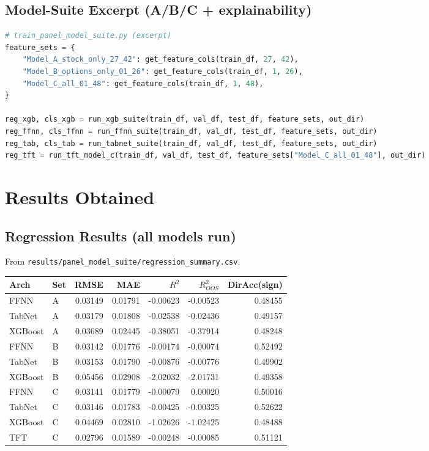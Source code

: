 \documentclass[11pt]{article}
\begin{document}
\subsection{Model-Suite Excerpt (A/B/C + explainability)}
\begin{lstlisting}[language=Python]
# train_panel_model_suite.py (excerpt)
feature_sets = {
    "Model_A_stock_only_27_42": get_feature_cols(train_df, 27, 42),
    "Model_B_options_only_01_26": get_feature_cols(train_df, 1, 26),
    "Model_C_all_01_48": get_feature_cols(train_df, 1, 48),
}

reg_xgb, cls_xgb = run_xgb_suite(train_df, val_df, test_df, feature_sets, out_dir)
reg_ffnn, cls_ffnn = run_ffnn_suite(train_df, val_df, test_df, feature_sets, out_dir)
reg_tab, cls_tab = run_tabnet_suite(train_df, val_df, test_df, feature_sets, out_dir)
reg_tft = run_tft_model_c(train_df, val_df, test_df, feature_sets["Model_C_all_01_48"], out_dir)
\end{lstlisting}

\section{Results Obtained}

\subsection{Regression Results (all models run)}
From \texttt{results/panel\_model\_suite/regression\_summary.csv}.

\begin{footnotesize}
\begin{longtable}{l l r r r r r}
\toprule
Arch & Set & RMSE & MAE & $R^2$ & $R^2_{OOS}$ & DirAcc(sign) \\
\midrule
\endhead
FFNN & A & 0.03149 & 0.01791 & -0.00623 & -0.00523 & 0.48455 \\
TabNet & A & 0.03179 & 0.01808 & -0.02538 & -0.02436 & 0.49157 \\
XGBoost & A & 0.03689 & 0.02445 & -0.38051 & -0.37914 & 0.48248 \\
FFNN & B & 0.03142 & 0.01776 & -0.00174 & -0.00074 & 0.52492 \\
TabNet & B & 0.03153 & 0.01790 & -0.00876 & -0.00776 & 0.49902 \\
XGBoost & B & 0.05456 & 0.02908 & -2.02032 & -2.01731 & 0.49358 \\
FFNN & C & 0.03141 & 0.01779 & -0.00079 &  0.00020 & 0.50016 \\
TabNet & C & 0.03146 & 0.01783 & -0.00425 & -0.00325 & 0.52622 \\
XGBoost & C & 0.04469 & 0.02810 & -1.02626 & -1.02425 & 0.48488 \\
TFT & C & 0.02796 & 0.01589 & -0.00248 & -0.00085 & 0.51121 \\
\bottomrule
\end{longtable}
\end{footnotesize}
\end{document}

